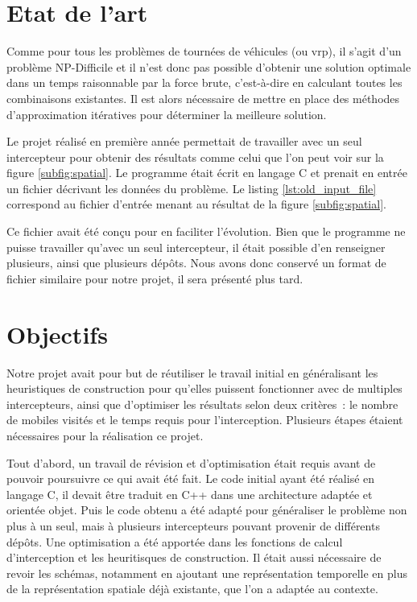	\section{Etat de l'art}
		Comme pour tous les problèmes de tournées de véhicules (ou \acrlong{vrp}), il s'agit d'un problème NP-Difficile et il n'est donc pas possible d'obtenir une solution optimale dans un temps raisonnable par la force brute, c'est-à-dire en calculant toutes les combinaisons existantes. Il est alors nécessaire de mettre en place des méthodes d'approximation itératives pour déterminer la meilleure solution.

		Le projet réalisé en première année permettait de travailler avec un seul intercepteur pour obtenir des résultats comme celui que l'on peut voir sur la figure \ref{subfig:spatial}. Le programme était écrit en langage C et prenait en entrée un fichier décrivant les données du problème. Le listing \ref{lst:old_input_file} correspond au fichier d'entrée menant au résultat de la figure \ref{subfig:spatial}.

		Ce fichier avait été conçu pour en faciliter l'évolution. Bien que le programme ne puisse travailler qu'avec un seul intercepteur, il était possible d'en renseigner plusieurs, ainsi que plusieurs dépôts. Nous avons donc conservé un format de fichier similaire pour notre projet, il sera présenté plus tard.

		\begin{code}
			\label{lst:old_input_file}
		\end{code}

	\section{Objectifs}
		Notre projet avait pour but de réutiliser le travail initial en généralisant les heuristiques de construction pour qu'elles puissent fonctionner avec de multiples intercepteurs, ainsi que d'optimiser les résultats selon deux critères : le nombre de mobiles visités et le temps requis pour l'interception.
		Plusieurs étapes étaient nécessaires pour la réalisation ce projet.

		Tout d'abord, un travail de révision et d'optimisation était requis avant de pouvoir poursuivre ce qui avait été fait. Le code initial ayant été réalisé en langage C, il devait être traduit en C++ dans une architecture adaptée et orientée objet. Puis le code obtenu a été adapté pour généraliser le problème non plus à un seul, mais à plusieurs intercepteurs pouvant provenir de différents dépôts. Une optimisation a été apportée dans les fonctions de calcul d'interception et les heuritisques de construction. Il était aussi nécessaire de revoir les schémas, notamment en ajoutant une représentation temporelle en plus de la représentation spatiale déjà existante, que l'on a adaptée au contexte.

